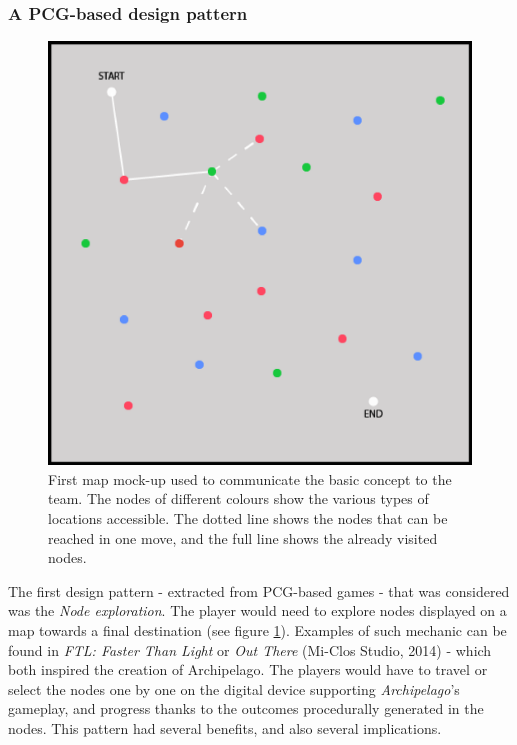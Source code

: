 \subsubsection{A PCG-based design pattern}
\begin{figure}[h]
    \centering
    \includegraphics[scale=0.4]{Images/protomap.png}
    \caption{First map mock-up used to communicate the basic concept to the team. The nodes of different colours show the various types of locations accessible. The dotted line shows the nodes that can be reached in one move, and the full line shows the already visited nodes.}
    \label{fig:map}
\end{figure}
The first design pattern - extracted from PCG-based games - that was considered  was the \textit{Node exploration}. The player would need to explore nodes displayed on a map towards a final destination (see figure \ref{fig:map}). Examples of such mechanic can be found in \textit{FTL: Faster Than Light} \cite{game:ftl} or \textit{Out There} (Mi-Clos Studio, 2014)\cite{game:outthere} - which both inspired the creation of Archipelago. The players would have to travel or select the nodes one by one on the digital device supporting  \textit{Archipelago}'s gameplay, and progress thanks to the outcomes procedurally generated in the nodes. This pattern had several benefits, and also several implications. 

